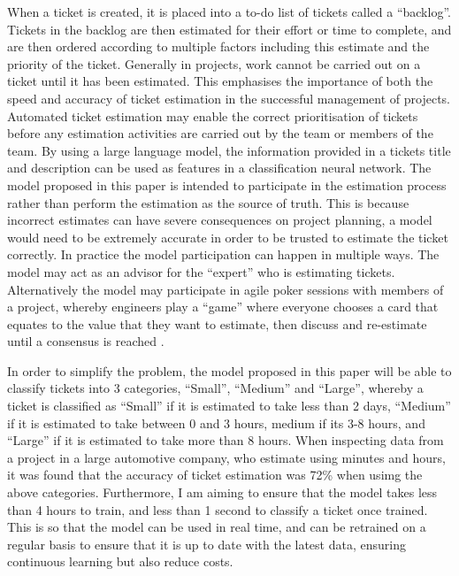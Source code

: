 \documentclass{UoYCSproject}
\begin{document}
    When a ticket is created, it is placed into a to-do list of tickets called a “backlog”.
    Tickets in the backlog are then estimated for their effort or time to complete, and are then ordered according to multiple factors including this estimate and the priority of the ticket.
    Generally in projects, work cannot be carried out on a ticket until it has been estimated.
    This emphasises the importance of both the speed and accuracy of ticket estimation in the successful management of projects.
    Automated ticket estimation may enable the correct prioritisation of tickets before any estimation activities are carried out by the team or members of the team.
    By using a large language model, the information provided in a tickets title and description can be used as features in a classification neural network.
    The model proposed in this paper is intended to participate in the estimation process rather than perform the estimation as the source of truth.
    This is because incorrect estimates can have severe consequences on project planning, a model would need to be extremely accurate in order to be trusted to estimate the ticket correctly.
    In practice the model participation can happen in multiple ways.
    The model may act as an advisor for the “expert” who is estimating tickets.
    Alternatively the model may participate in agile poker sessions with members of a project, whereby engineers play a “game” where everyone chooses a card that equates to the value that they want to estimate, then discuss and re-estimate until a consensus is reached \cite{1667560}. \par

    In order to simplify the problem, the model proposed in this paper will be able to classify tickets into 3 categories, “Small”, “Medium” and “Large”, whereby a ticket is classified as “Small” if it is estimated to take less than 2 days, “Medium” if it is estimated to take between 0 and 3 hours, medium if its 3-8 hours, and “Large” if it is estimated to take more than 8 hours.
    When inspecting data from a project in a large automotive company, who estimate using minutes and hours, it was found that the accuracy of ticket estimation was 72\% when usimg the above categories.
    Furthermore, I am aiming to ensure that the model takes less than 4 hours to train, and less than 1 second to classify a ticket once trained.
    This is so that the model can be used in real time, and can be retrained on a regular basis to ensure that it is up to date with the latest data, ensuring continuous learning but also reduce costs. \par
\end{document}
